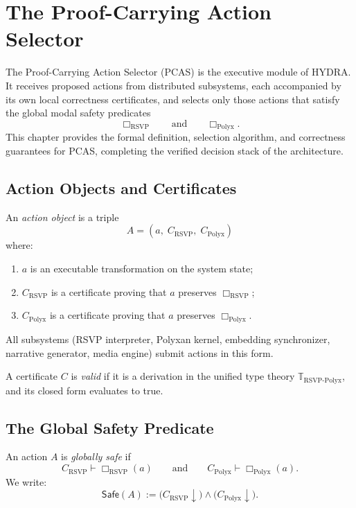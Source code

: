 \chapter{The Proof-Carrying Action Selector}
\label{ch:77}

The Proof-Carrying Action Selector (PCAS) is the executive module of HYDRA.
It receives proposed actions from distributed subsystems, each accompanied by
its own local correctness certificates, and selects only those actions that
satisfy the global modal safety predicates
\[
\Box_{\mathrm{RSVP}}
\qquad\text{and}\qquad
\Box_{\mathrm{Polyx}}.
\]
This chapter provides the formal definition, selection algorithm,
and correctness guarantees for PCAS, completing the verified decision stack
of the architecture.

\section{Action Objects and Certificates}

\begin{definition}
An \emph{action object} is a triple
\[
A = (a,\; C_{\mathrm{RSVP}},\; C_{\mathrm{Polyx}})
\]
where:
\begin{enumerate}
\item $a$ is an executable transformation on the system state;
\item $C_{\mathrm{RSVP}}$ is a certificate proving that $a$ preserves
      $\Box_{\mathrm{RSVP}}$;
\item $C_{\mathrm{Polyx}}$ is a certificate proving that $a$ preserves
      $\Box_{\mathrm{Polyx}}$.
\end{enumerate}
\end{definition}

All subsystems (RSVP interpreter, Polyxan kernel, embedding synchronizer,
narrative generator, media engine) submit actions in this form.

\begin{definition}
A certificate $C$ is \emph{valid} if it is a derivation in the unified
type theory $\mathbb{T}_{\mathrm{RSVP\text{-}Polyx}}$, and its closed form
evaluates to \textsf{true}.
\end{definition}

\section{The Global Safety Predicate}

\begin{definition}
An action $A$ is \emph{globally safe} if
\[
C_{\mathrm{RSVP}} \vdash \Box_{\mathrm{RSVP}}(a)
\qquad\text{and}\qquad
C_{\mathrm{Polyx}} \vdash \Box_{\mathrm{Polyx}}(a).
\]
We write:
\[
\mathsf{Safe}(A) := 
\bigl(C_{\mathrm{RSVP}}\!\downarrow\bigr) \land 
\bigl(C_{\mathrm{Polyx}}\!\downarrow\bigr).
\]
\end{definition}

